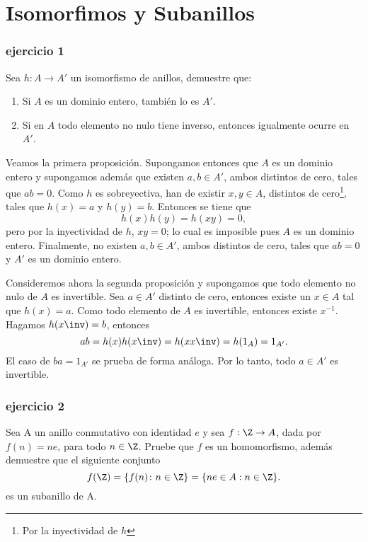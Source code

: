 

 \thispagestyle{plain}
 \chapter*{Isomorfimos y Subanillos}
\subsection*{ejercicio 1}
Sea $h: A \rightarrow A'$ un isomorfismo de anillos, demuestre que: 
\begin{enumerate}
	\item Si $A$ es un dominio entero, también lo es $A'$.
	\item Si en $A$ todo elemento no nulo tiene inverso, entonces igualmente ocurre en $A'$.
\end{enumerate}
\begin{sol}
	Veamos la primera proposición. Supongamos entonces que $A$ es un dominio entero y supongamos además que existen $a,b \in A'$, ambos distintos de cero, tales que $ab=0$. Como $h$ es sobreyectiva, han de existir $x,y \in A$, distintos de cero\footnote{Por la inyectividad de $h$}, tales que $h(x) = a$ y $h(y) = b$. Entonces se tiene que
	\[ h(x)h(y) = h(xy) = 0, \] 
	pero por la inyectividad de $h$, $xy=0$; lo cual es imposible pues $ A $ es un dominio entero. Finalmente, no existen $a,b \in A'$, ambos distintos de cero, tales que $ab = 0$ y $A'$ es un dominio entero. 
	
	Consideremos ahora la segunda proposición y supongamos que todo elemento no nulo de $A$ es invertible. Sea $a \in A'$ distinto de cero, entonces existe un $x \in A$ tal que $h(x)=a$. Como todo elemento de $A$ es invertible, entonces existe $x^{-1}$. Hagamos $ h(x\inv)=b $, entonces
	\[ ab = h(x)h(x\inv) = h(xx\inv) = h(1_A) = 1_{A'}. \]  
	El caso de $ ba = 1_{A'} $ se prueba de forma análoga. Por lo tanto, todo $a \in A'$ es invertible. 
\end{sol} 

\subsection*{ejercicio 2}
	Sea A un anillo conmutativo con identidad $e$ y sea $f:\Z \rightarrow A$, dada por $f(n)=ne $, para todo $ n \in \Z$. Pruebe que $f$ es un homomorfismo, además demuestre que el siguiente conjunto 
\[ f(\Z) = \{f(n)\colon n \in \Z \} = \{ne \in A: n \in \Z \}.\]
es un subanillo de A.

